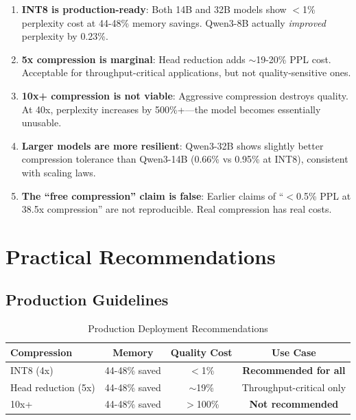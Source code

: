 \documentclass[11pt]{article}
\begin{document}
\begin{enumerate}
    \item \textbf{INT8 is production-ready}: Both 14B and 32B models show $<$1\% perplexity cost at 44-48\% memory savings. Qwen3-8B actually \textit{improved} perplexity by 0.23\%.

    \item \textbf{5x compression is marginal}: Head reduction adds $\sim$19-20\% PPL cost. Acceptable for throughput-critical applications, but not quality-sensitive ones.

    \item \textbf{10x+ compression is not viable}: Aggressive compression destroys quality. At 40x, perplexity increases by 500\%+—the model becomes essentially unusable.

    \item \textbf{Larger models are more resilient}: Qwen3-32B shows slightly better compression tolerance than Qwen3-14B (0.66\% vs 0.95\% at INT8), consistent with scaling laws.

    \item \textbf{The ``free compression'' claim is false}: Earlier claims of ``$<$0.5\% PPL at 38.5x compression'' are not reproducible. Real compression has real costs.
\end{enumerate}

\section{Practical Recommendations}

\subsection{Production Guidelines}

\begin{table}[h]
\centering
\caption{Production Deployment Recommendations}
\begin{tabular}{@{}lccc@{}}
\toprule
Compression & Memory & Quality Cost & Use Case \\
\midrule
INT8 (4x) & 44-48\% saved & $<$1\% & \textbf{Recommended for all} \\
Head reduction (5x) & 44-48\% saved & $\sim$19\% & Throughput-critical only \\
10x+ & 44-48\% saved & $>$100\% & \textbf{Not recommended} \\
\bottomrule
\end{tabular}
\end{table}
\end{document}

